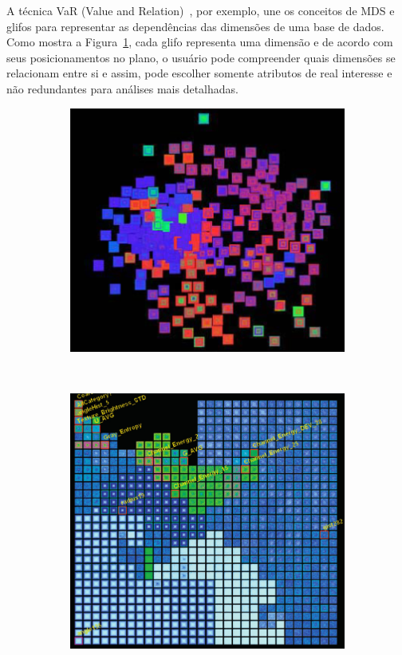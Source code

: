 A técnica VaR (Value and Relation)~\cite{Yang2004}, por exemplo, une os conceitos de MDS e glifos para representar as dependências das dimensões de uma base de dados. Como mostra a Figura~\ref{fig:var1}, cada glifo representa uma dimensão e de acordo com seus posicionamentos no plano, o usuário pode compreender quais dimensões se relacionam entre si e assim, pode escolher somente atributos de real interesse e não redundantes para análises mais detalhadas.

\begin{figure}[h!]
  \centering
  \begin{subfigure}[b]{0.5\textwidth}
    \centering
    \includegraphics[width=\textwidth]{images/var1.png}
    \caption{}
    \label{fig:var1}
  \end{subfigure}%
  ~ %
  \begin{subfigure}[b]{0.475\textwidth}
    \centering
    \includegraphics[width=\textwidth]{images/var2.png}

\end{subfigure}
\end{figure}
